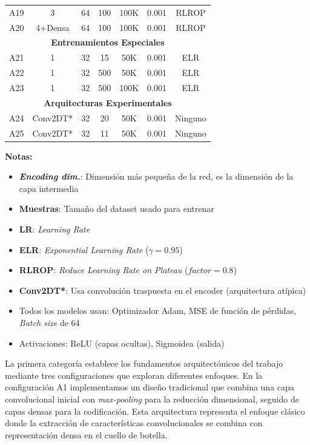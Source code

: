 \begin{table}[htbp]
\begin{tabular}{|c|c|c|c|c|c|c|}
A19 & 3 & 64 & 100 & 100K & 0.001 & RLROP \\
A20 & 4+Densa & 64 & 100 & 100K & 0.001 & RLROP \\
\hline
\hline
\multicolumn{7}{|c|}{\textbf{Entrenamientos Especiales}} \\
\hline
A21 & 1 & 32 & 15 & 50K & 0.001 & ELR \\
A22 & 1 & 32 & 500 & 50K & 0.001 & ELR \\
A23 & 1 & 32 & 500 & 100K & 0.001 & ELR \\
\hline
\hline
\multicolumn{7}{|c|}{\textbf{Arquitecturas Experimentales}} \\
\hline
A24 & Conv2DT* & 32 & 20 & 50K & 0.001 & Ninguno \\
A25 & Conv2DT* & 32 & 11 & 50K & 0.001 & Ninguno \\
\hline
\end{tabular}

\begin{flushleft}
\footnotesize
\textbf{Notas:}
\begin{itemize}
    \item \textbf{\emph{Encoding dim.}}: Dimensión más pequeña de la red, es la dimensión de la capa intermedia
    \item \textbf{Muestras}: Tamaño del dataset usado para entrenar
    \item \textbf{LR}: \emph{Learning Rate}
    \item \textbf{ELR}: \emph{Exponential Learning Rate} ($\gamma=0.95$)
    \item \textbf{RLROP}: \emph{Reduce Learning Rate on Plateau} ($factor=0.8$)
    \item \textbf{Conv2DT*}: Usa convolución traspuesta en el encoder (arquitectura atípica)
    \item Todos los modelos usan: Optimizador Adam, MSE de función de pérdidas, \emph{Batch size} de 64
    \item Activaciones: ReLU (capas ocultas), Sigmoidea (salida)
\end{itemize}
\end{flushleft}
\end{table}


La primera categoría establece los fundamentos arquitectónicos del trabajo mediante tres configuraciones que exploran diferentes enfoques. En la configuración A1 implementamos un diseño tradicional que combina una capa convolucional inicial con \emph{max-pooling} para la reducción dimensional, seguido de capas densas para la codificación. Esta arquitectura representa el enfoque clásico donde la extracción de características convolucionales se combina con representación densa en el cuello de botella.

